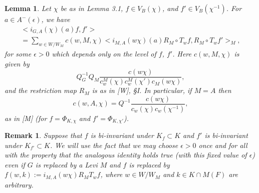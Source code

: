 \documentclass[12pt]{article}
\newtheorem{lemma}{Lemma}[section]
\newtheorem{remark}{Remark}
\begin{document}
\begin{lemma}
Let $\chi$ be as in Lemma 3.1, $f\in V_B(\chi)$, and $f'\in V_B(\chi^{-1})$. For $a\in A^-(\epsilon)$, we have
\[
\begin{array}{c}
<i_{G,A}(\chi)(a)f,f'>\\
=\sum_{w\in W/W_M}c(w,M,\chi)<i_{M,A}(w\chi)(a)R_M\circ T_wf,R_M\circ T_wf'>_M,
\end{array}
\]
for some $\epsilon>0$ which depends only on the level of $f$, $f'$. Here $c(w,M,\chi)$ is given by
\[
Q_G^{-1}Q_M\frac{c(w\chi)}{c^M_w(\chi)c^M_w(\chi')c_M(w\chi)},
\]
and the restriction map $R_M$ is as in [W], \S I. In particular, if $M=A$ then
\[
c(w,A,\chi)=Q^{-1}\frac{c(w\chi)}{c_w(\chi)c_w(\chi^{-1})},
\]
as in [M] (for $f=\Phi_{K,\chi}$ and $f'=\Phi_{K,\chi'}$).
\end{lemma}

\begin{remark}
Suppose that $f$ is bi-invariant under $K_f\subset K$ and $f'$ is bi-invariant under $K_{f'}\subset K$. We will use the fact that we may choose $\epsilon>0$ once and for all with the property that the analogous identity holds true (with this fixed value of $\epsilon$) even if $G$ is replaced by a Levi $M$ and $f$ is replaced by $f(w,k):=i_{M,A}(w\chi)R_MT_wf$, where $w\in W/W_M$ and $k\in K\cap M(F)$ are arbitrary.
\end{remark}
\end{document}
